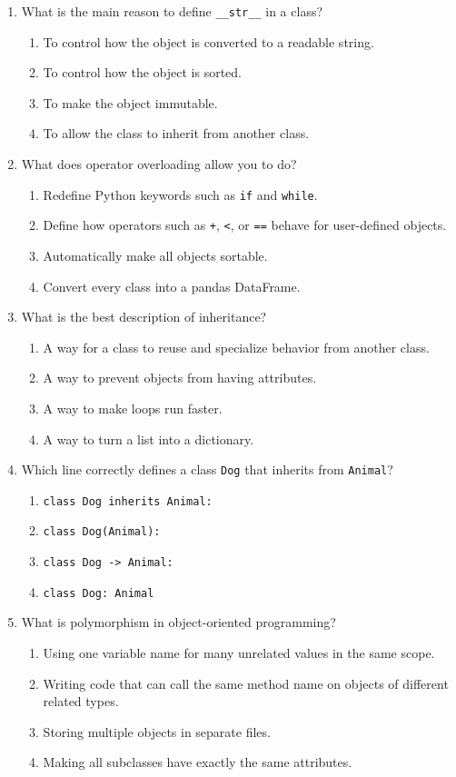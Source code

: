 \documentclass[12pt]{article}
\begin{document}
\begin{enumerate}[label=\arabic*.]
\item What is the main reason to define \texttt{\_\_str\_\_} in a class?
\begin{enumerate}[label=\Alph*.]
\item To control how the object is converted to a readable string.
\item To control how the object is sorted.
\item To make the object immutable.
\item To allow the class to inherit from another class.
\end{enumerate}

\item What does operator overloading allow you to do?
\begin{enumerate}[label=\Alph*.]
\item Redefine Python keywords such as \texttt{if} and \texttt{while}.
\item Define how operators such as \texttt{+}, \texttt{<}, or \texttt{==} behave for user-defined objects.
\item Automatically make all objects sortable.
\item Convert every class into a pandas DataFrame.
\end{enumerate}

\item What is the best description of inheritance?
\begin{enumerate}[label=\Alph*.]
\item A way for a class to reuse and specialize behavior from another class.
\item A way to prevent objects from having attributes.
\item A way to make loops run faster.
\item A way to turn a list into a dictionary.
\end{enumerate}

\item Which line correctly defines a class \texttt{Dog} that inherits from \texttt{Animal}?
\begin{enumerate}[label=\Alph*.]
\item \texttt{class Dog inherits Animal:}
\item \texttt{class Dog(Animal):}
\item \texttt{class Dog -> Animal:}
\item \texttt{class Dog: Animal}
\end{enumerate}

\item What is polymorphism in object-oriented programming?
\begin{enumerate}[label=\Alph*.]
\item Using one variable name for many unrelated values in the same scope.
\item Writing code that can call the same method name on objects of different related types.
\item Storing multiple objects in separate files.
\item Making all subclasses have exactly the same attributes.
\end{enumerate}


\end{enumerate}
\end{document}

